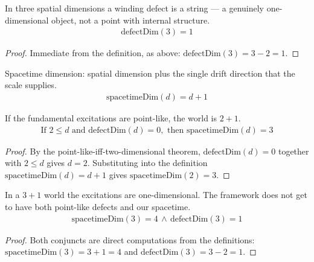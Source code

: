 \begin{theorem}
In three spatial dimensions a winding defect is a string — a genuinely one-dimensional object, not a point with internal structure.
\begin{align*}
\text{defectDim}(3) = 1
\end{align*}
\begin{proof}
Immediate from the definition, as above: $\text{defectDim}(3)=3-2=1$.
\end{proof}
\end{theorem}

\begin{definition}
Spacetime dimension: spatial dimension plus the single drift direction that the scale supplies.
\begin{align*}
\text{spacetimeDim}(d) = d + 1
\end{align*}
\end{definition}

\begin{theorem}
If the fundamental excitations are point-like, the world is $2+1$.
\begin{align*}
\text{If } 2 \le d \text{ and } \text{defectDim}(d) = 0, \text{ then } \text{spacetimeDim}(d) = 3
\end{align*}
\begin{proof}
By the point-like-iff-two-dimensional theorem, $\text{defectDim}(d)=0$ together with $2\leq d$ gives $d=2$. Substituting into the definition $\text{spacetimeDim}(d)=d+1$ gives $\text{spacetimeDim}(2)=3$.
\end{proof}
\end{theorem}

\begin{theorem}
In a $3+1$ world the excitations are one-dimensional.  The framework does not get to have both point-like defects and our spacetime.
\begin{align*}
\text{spacetimeDim}(3) = 4 \,\wedge\, \text{defectDim}(3) = 1
\end{align*}
\begin{proof}
Both conjuncts are direct computations from the definitions: $\text{spacetimeDim}(3)=3+1=4$ and $\text{defectDim}(3)=3-2=1$.
\end{proof}
\end{theorem}

